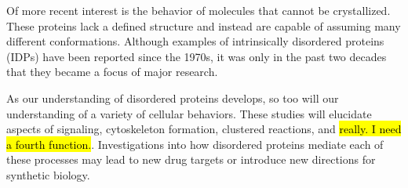 \documentclass[../AdvancementSummary.tex]{subfiles}
\begin{document}
Of more recent interest is the behavior of molecules that cannot be crystallized. These proteins lack a defined structure and instead are capable of assuming many different conformations. Although examples of intrinsically disordered proteins (IDPs) have been reported since the 1970s, it was only in the past two decades that they became a focus of major research. \cite{Dunker2008} 

As our understanding of disordered proteins develops, so too will our understanding of a variety of cellular behaviors. These studies will elucidate aspects of signaling, cytoskeleton formation, clustered reactions, and \hl{really.  I need a fourth function.}. Investigations into how disordered proteins mediate each of these processes may lead to new drug targets or introduce new directions for synthetic biology.


\end{document}
